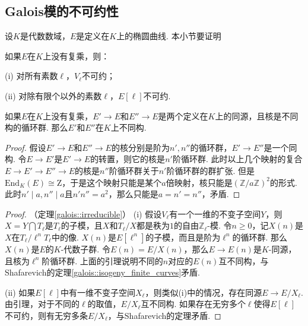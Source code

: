 \subsection{Galois模的不可约性}

设$K$是代数数域，$E$是定义在$K$上的椭圆曲线. 本小节要证明

\begin{cthm}
    如果$E$在$K$上没有复乘，则：

    (i) 对所有素数$\ell$，$V_{\ell}$不可约；

    (ii) 对除有限个以外的素数$\ell$，$E[\ell]$不可约.
    \label{galois::irreducible}
\end{cthm}

\begin{clem}
    如果$E$在$K$上没有复乘，$E'\to E$和$E''\to E$是两个定义在$K$上的同源，且核是不同构的循环群. 那么$E'$和$E''$在$K$上不同构.
\end{clem}

\begin{proof}
    假设$E'\to E$和$E''\to E$的核分别是阶为$n', n''$的循环群，$E'\to E''$是一个同构. 令$E\to E'$是$E'\to E$的转置，则它的核是$n'$阶循环群. 此时以上几个映射的复合$E\to E'\to E''\to E$的核是$n''$阶循环群关于$n'$阶循环群的群扩张. 但是$\mathrm{End}_K(E) \cong \mathrm{Z}$，于是这个映射只能是某个$a$倍映射，核只能是$(\mathbb{Z}/a\mathbb{Z})^2$的形式. 此时$n'\mid a, n''\mid a$且$n'n''=a^2$，那么只能是$a=n'=n''$，矛盾.
\end{proof}

\begin{proof}
    （定理\ref{galois::irreducible}）
    (i) 假设$V_{\ell}$有一个一维的不变子空间$Y$，则$X=Y\bigcap T_{\ell}$是$T_{\ell}$的子模，且$X$和$T_{\ell}/X$都是秩为$1$的自由$\mathbb{Z}_{\ell}$-模. 令$n\geq 0$，记$X(n)$是$X$在$T_{\ell} / \ell^n T_{\ell}$中的像. $X(n)$是$E[\ell^n]$的子模，而且是阶为$\ell^n$的循环群. 那么$X(n)$是$E$的$K$-代数子群. 令$E(n) = E/X(n)$，那么$E\to E(n)$是$K$-同源，且核为$\ell^n$阶循环群. 上面的引理说明不同的$n$对应的$E(n)$互不同构，与Shafarevich的定理\ref{galois::isogeny_finite_curves}矛盾.

    (ii) 如果$E[\ell]$中有一维不变子空间$X_{\ell}$，则类似(i)中的情况，存在同源$E\to E/X_{\ell}$. 由引理，对于不同的$\ell$的取值，$E/X_{\ell}$互不同构. 如果存在无穷多个$\ell$使得$E[\ell]$不可约，则有无穷多条$E/X_{\ell}$，与Shafarevich的定理矛盾.
\end{proof}
